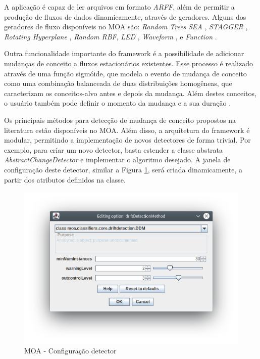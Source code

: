 \documentclass[qual, classic, a4paper]{ufbathesis}
\begin{document}
A aplicação é capaz de ler arquivos em formato \textit{ARFF}, além de permitir a produção de fluxos de dados dinamicamente, através de geradores.
Alguns dos geradores de fluxo disponíveis no MOA são:
\textit{Random Trees} \cite{Domingos:2000:MHD:347090.347107}
\textit{SEA} \cite{Street:2001:SEA:502512.502568}, 
\textit{STAGGER} \cite{Schlimmer1986}, 
\textit{Rotating Hyperplane} \cite{Wang:2003:MCD:956750.956778},
\textit{Random RBF}, 
\textit{LED} \cite{Gama:2003:ADT:956750.956813}, 
\textit{Waveform} \cite{Gama:2003:ADT:956750.956813}, 
 e \textit{Function} \cite{Jin:2003:EDT:956750.956821}.

Outra funcionalidade importante do framework é a possibilidade de adicionar mudanças de conceito a fluxos estacionários existentes.
Esse processo é realizado através de uma função sigmóide, que modela o evento de mudança de conceito como uma combinação balanceada de duas distribuições homogêneas, 
que caracterizam os conceitos-alvo antes e depois da mudança.
Além destes conceitos, o usuário também pode definir o momento da mudança e a sua duração \cite{Bifet:2010:MMO:1756006.1859903}.

Os principais métodos para detecção de mudança de conceito propostos na literatura estão disponíveis no MOA.
Além disso, a arquitetura do framework é modular, permitindo a implementação de novos detectores de forma trivial.
Por exemplo, para criar um novo detector, basta estender a classe abstrata \textit{AbstractChangeDetector} e implementar o algoritmo desejado.
A janela de configuração deste detector, similar a Figura \ref{fig:moa_detector}, será criada dinamicamente, a partir dos atributos definidos na classe.

\begin{figure}[H]
\begin{center}
    \includegraphics[scale=1]{imagens/detector.png}
    \caption{MOA - Configuração detector}
    \label{fig:moa_detector}
\end{center}
\end{figure}
    
\end{document}
